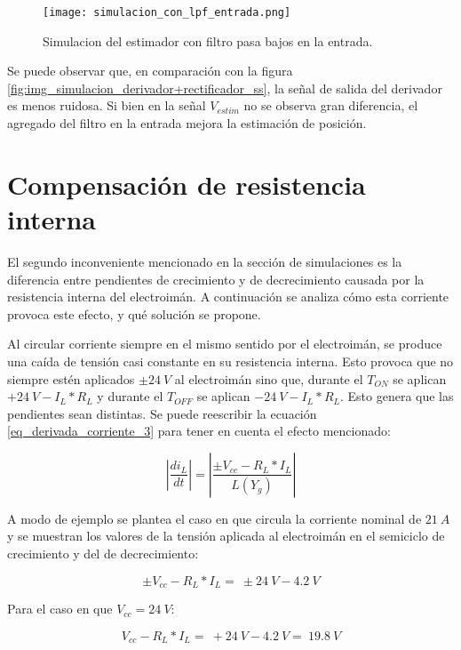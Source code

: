\begin{figure}[H]
	\centering
	\texttt{[image: simulacion\_con\_lpf\_entrada.png]}
	\caption{Simulacion del estimador con filtro pasa 	bajos en la entrada.}
	\label{fig:img_simulacion_lpf_entrada}
\end{figure}

Se puede observar que, en comparación con la figura \ref{fig:img_simulacion_derivador+rectificador_ss}, la señal de salida del derivador es menos ruidosa. Si bien en la señal $V_{estim}$ no se observa gran diferencia, el agregado del filtro en la entrada mejora la estimación de posición.

\section{Compensación de resistencia interna}

El segundo inconveniente mencionado en la sección de simulaciones es la diferencia entre pendientes de crecimiento y de decrecimiento causada por la resistencia interna del electroimán. A continuación se analiza cómo esta corriente provoca este efecto, y qué solución se propone.

Al circular corriente siempre en el mismo sentido por el electroimán, se produce una caída de tensión casi constante en su resistencia interna. Esto provoca que no siempre estén aplicados $\pm 24\:V$ al electroimán sino que, durante el $T_{ON}$ se aplican $+24\:V-I_L*R_L$ y durante el $T_{OFF}$ se aplican $-24\:V-I_L*R_L$. Esto genera que las pendientes sean distintas. Se puede reescribir la ecuación \ref{eq_derivada_corriente_3} para tener en cuenta el efecto mencionado:

\begin{equation} \label{eq_Vbus-didt-RL}
	\left|\frac{di_L}{dt}\right|=\left|\frac{\pm V_{cc}-R_L*I_L}{L(Y_g)}\right|
\end{equation}

A modo de ejemplo se plantea el caso en que circula la corriente nominal de $21\:A$ y se muestran los valores de la tensión aplicada al electroimán en el semiciclo de crecimiento y del de decrecimiento:

\begin{equation} \label{eq_Vbus-didt-RL-2}
	\pm V_{cc}-R_L*I_L=\ \pm 24\:V-4.2\:V
\end{equation}

Para el caso en que $V_{cc}=24\:V$:

\begin{equation} \label{eq_Vbus-didt-RL-3}
	V_{cc}-R_L*I_L=\ +24\:V-4.2\:V=\ 19.8\:V
\end{equation}

